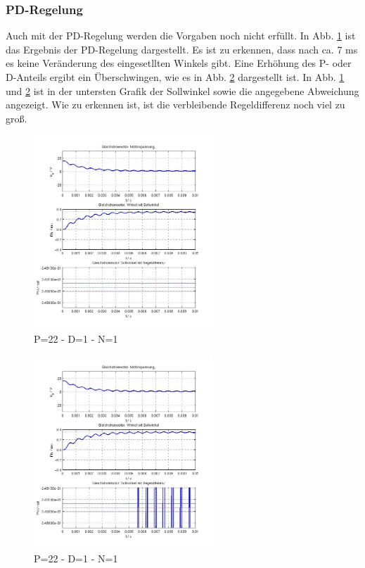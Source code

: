 \subsubsection{PD-Regelung}
\label{chap:pd_regelung}
Auch mit der PD-Regelung werden die Vorgaben noch nicht erfüllt. 
In Abb. \ref{fig:p22d1n1} ist das Ergebnis der PD-Regelung dargestellt. 
Es ist zu erkennen, dass nach ca. 7 ms es keine Veränderung des eingesetllten Winkels gibt. 
Eine Erhöhung des P- oder D-Anteils ergibt ein Überschwingen, wie es in Abb. \ref{fig:p23d1n1} dargestellt ist.
In Abb. \ref{fig:p22d1n1} und \ref{fig:p23d1n1} ist in der untersten Grafik der Sollwinkel sowie die angegebene Abweichung angezeigt. 
Wie zu erkennen ist, ist die verbleibende Regeldifferenz noch viel zu groß. 

\begin{figure}[!h]
	\centering
	\includegraphics[width=0.6\textwidth]{PD-P22D1N1.jpg}
	\caption{P=22 - D=1 - N=1}
	\label{fig:p22d1n1}
\end{figure}
\begin{figure}[!h]
	\centering
	\includegraphics[width=0.6\textwidth]{PD-P23D1N1.jpg}
	\caption{P=22 - D=1 - N=1}
	\label{fig:p23d1n1}
\end{figure}
